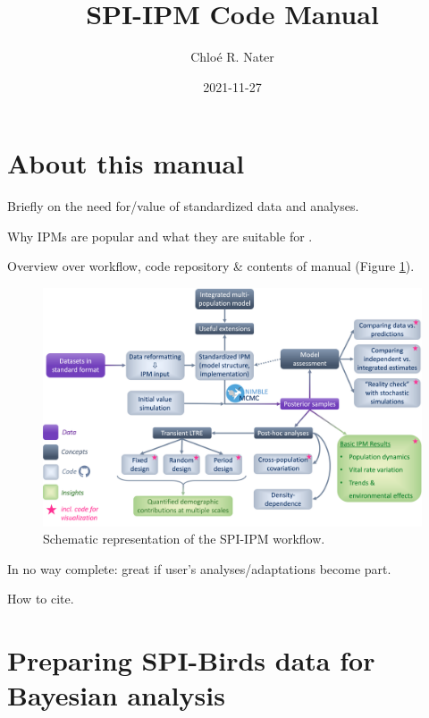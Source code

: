 \documentclass[
]{book}
\title{SPI-IPM Code Manual}
\author{Chloé R. Nater}
\date{2021-11-27}
\begin{document}
\maketitle

{
\setcounter{tocdepth}{1}
\tableofcontents
}
\hypertarget{about-this-manual}{%
\chapter*{About this manual}\label{about-this-manual}}

Briefly on the need for/value of standardized data and analyses.

Why IPMs are popular and what they are suitable for \citep{kery2011, plard2019}.

Overview over workflow, code repository \& contents of manual (Figure \ref{fig:WorkflowDiag}).

\begin{figure}

{\centering \includegraphics[width=1\linewidth]{Figures/SPI-IPM_Workflow} 

}

\caption{Schematic representation of the SPI-IPM workflow.}\label{fig:WorkflowDiag}
\end{figure}

In no way complete: great if user's analyses/adaptations become part.

How to cite.

\hypertarget{DataPrep}{%
\chapter{Preparing SPI-Birds data for Bayesian analysis}\label{DataPrep}}
\end{document}
